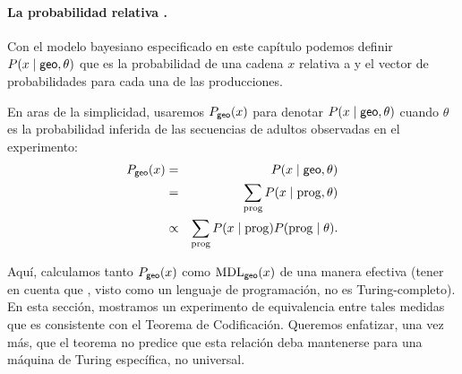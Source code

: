 
\paragraph{La probabilidad relativa \gramgeo.} 

Con el modelo bayesiano especificado en este capítulo podemos definir $P(x \mid {\sf geo}, \theta)$ que es la probabilidad de una cadena $x$ relativa a \gramgeo y el vector de probabilidades para cada una de las producciones.

En aras de la simplicidad, usaremos $P_{{\sf geo}}(x)$ para denotar $P(x \mid {\sf geo}, \theta)$ cuando $\theta$ es la probabilidad inferida de las secuencias de adultos observadas en el experimento:
%
\begin{eqnarray*}
\label{eqG}
P_{{\sf geo}}(x) &=& P(x \mid {\sf geo}, \theta)\\
&=& \sum_{{\rm prog}} P(x \mid {\rm prog}, \theta)\\
&\propto &\sum_{{\rm prog}} P(x \mid {\rm prog}) P({\rm prog} \mid \theta).
\end{eqnarray*}
%


Aquí, calculamos tanto $P_{{\sf geo}}(x)$ como ${\rm MDL}_{{\sf geo}}(x)$ de una manera efectiva (tener en cuenta que \gramgeo, visto como un lenguaje de programación, no es Turing-completo). En esta sección, mostramos un experimento de equivalencia entre tales medidas que es consistente con el Teorema de Codificación. Queremos enfatizar, una vez más, que el teorema no predice que esta relación deba mantenerse para una máquina de Turing específica, no universal.


